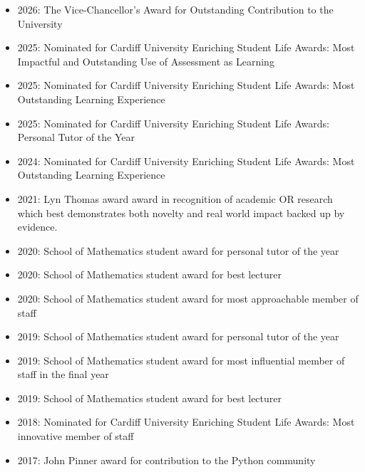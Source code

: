 \documentclass[10pt]{article}
\begin{document}
\begin{itemize}

  \item 2026: The Vice-Chancellor's Award for Outstanding Contribution to the University

  \item 2025: Nominated for Cardiff University Enriching Student Life Awards: Most Impactful and Outstanding Use of Assessment as Learning

  \item 2025: Nominated for Cardiff University Enriching Student Life Awards: Most Outstanding Learning Experience

  \item 2025: Nominated for Cardiff University Enriching Student Life Awards: Personal Tutor of the Year

  \item 2024: Nominated for Cardiff University Enriching Student Life Awards: Most Outstanding Learning Experience

  \item 2021: Lyn Thomas award award in recognition of academic OR research which best demonstrates both novelty and real world impact backed up by evidence.

  \item 2020: School of Mathematics student award for personal tutor of the year

  \item 2020: School of Mathematics student award for best lecturer

  \item 2020: School of Mathematics student award for most approachable member of staff

  \item 2019: School of Mathematics student award for personal tutor of the year

  \item 2019: School of Mathematics student award for most influential member of staff in the final year

  \item 2019: School of Mathematics student award for best lecturer

  \item 2018: Nominated for Cardiff University Enriching Student Life Awards: Most innovative member of staff

  \item 2017: John Pinner award for contribution to the Python community


\end{itemize}
\end{document}
